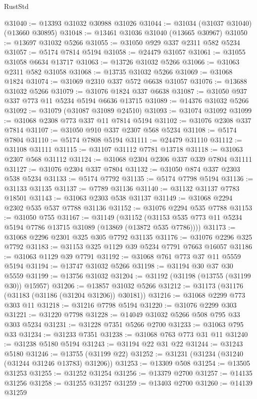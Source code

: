 \begin{lexlean}{RustStd}
\begin{coremodule}
@31040 := @13393 @31032 @30988 @31026
@31044 := @31034 (@31037 @31040) (@13660 @30895)
@31048 := @13461 @31036 @31040 (@13665 @30967)
@31050 := @13697 @31032 @5266
@31055 := @31050 @929 @337 @2311 @582 @5234
@31057 := @5174 @7814 @5194
@31058 := @24479 @31057
@31061 := @31055 @31058 @6634 @13717
@31063 := @13726 @31032 @5266
@31066 := @31063 @2311 @582 @31058
@31068 := @13735 @31032 @5266
@31069 := @31068 @1824
@31074 := @31069 @2310 @337 @572 @6638 @31057
@31076 := @13688 @31032 @5266
@31079 := @31076 @1824 @337 @6638
@31087 := @31050 @937 @337 @773 @11 @5234 @5194 @6636 @13715
@31089 := @14376 @31032 @5266
@31092 := @31079 (@31087 @31089 @24510)
@31093 := @31074 @31092
@31099 := @31068 @2308 @773 @337 @11 @7814 @5194
@31102 := @31076 @2308 @337 @7814
@31107 := @31050 @910 @337 @2307 @568 @5234
@31108 := @5174 @7804
@31110 := @5174 @7808 @5194
@31111 := @24479 @31110
@31112 := @31108 @31111
@31115 := @31107 @31112 @7781 @13718
@31118 := @31063 @2307 @568 @31112
@31124 := @31068 @2304 @2306 @337 @339 @7804 @31111
@31127 := @31076 @2304 @337 @7804
@31132 := @31050 @874 @337 @2303 @538 @5234
@31133 := @5174 @7792
@31135 := @5174 @7798 @5194
@31136 := @31133 @31135
@31137 := @7789 @31136
@31140 := @31132 @31137 @7783 @18501
@31143 := @31063 @2303 @538 @31137
@31149 := @31068 @2294 @2302 @535 @537 @7788 @31136
@31152 := @31076 @2294 @535 @7788
@31153 := @31050 @755
@31167 := @31149
    (@31152 (@31153 @535 @773 @11 @5234 @5194 @7786 @13715 @31089 (@13869 (@13872 @535 @7786))))
@31173 := @31068 @2296 @2301 @325 @305 @7792 @31135
@31176 := @31076 @2296 @325 @7792
@31183 := @31153 @325 @1129 @39 @5234 @7791 @7663 @16057
@31186 := @31063 @1129 @39 @7791
@31192 := @31068 @761 @773 @37 @11 @5559 @5194
@31194 := @13747 @31032 @5266
@31198 := @31194 @30 @37 @30 @5559
@31199 := @13756 @31032
@31204 := @31192 (@31198 (@13755 (@31199 @30)) @15957)
@31206 := @13857 @31032 @5266
@31212 := @31173 (@31176 (@31183 (@31186 (@31204 @31206)) @30181))
@31216 := @31068 @2299 @773 @303 @11
@31218 := @31216 @7798 @5194
@31220 := @31076 @2299 @303
@31221 := @31220 @7798
@31228 := @14049 @31032 @5266 @508 @795 @33 @303 @5234
@31231 := @31228 @7351 @5266 @2700
@31233 := @31063 @795 @33
@31234 := @31233 @7351
@31238 := @31068 @763 @773 @31 @11
@31240 := @31238 @5180 @5194
@31243 := @31194 @22 @31 @22
@31244 := @31243 @5180
@31246 := @13755 (@31199 @22)
@31252 := @31231 (@31234 (@31240 (@31244 @31246 @13783) @31206))
@31253 := @13309 @508
@31254 := @13505 @31253
@31255 := @31252 @31254
@31256 := @13379 @2700
@31257 := @14135 @31256
@31258 := @31255 @31257
@31259 := @13403 @2700
@31260 := @14139 @31259

\end{coremodule}
\end{lexlean}
